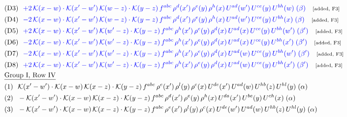 \documentclass[9pt]{article}
\begin{document}
\begin{align}
&\quad\text{(D3)}\ \ \textcolor{blue}{+2\,\mathcal{K}(x-w)\cdot\mathcal{K}(x'-w')\,\mathcal{K}(w-z)\cdot\mathcal{K}(y-z)\, f^{abc}\,\rho^{d}(x')\,\rho^{e}(y)\,\rho^{h}(x)\,U^{ad}(w')\,U^{ce}(y)\,U^{bh}(w)\;(\beta)}\quad\text{\scriptsize[added, F3]}\notag\\
&\quad\text{(D4)}\ \ \textcolor{blue}{-2\,\mathcal{K}(x-w)\cdot\mathcal{K}(x'-w')\,\mathcal{K}(w-z)\cdot\mathcal{K}(y-z)\, f^{abc}\,\rho^{d}(x')\,\rho^{e}(y)\,\rho^{h}(x)\,U^{ad}(w')\,U^{ce}(y)\,U^{bh}(x)\;(\beta)}\quad\text{\scriptsize[added, F3]}\notag\\
&\quad\text{(D5)}\ \ \textcolor{blue}{+2\,\mathcal{K}(x-w)\cdot\mathcal{K}(x'-w')\,\mathcal{K}(w'-z)\cdot\mathcal{K}(y-z)\, f^{abc}\,\rho^{h}(x')\,\rho^{e}(y)\,\rho^{d}(x)\,U^{ad}(x)\,U^{ce}(y)\,U^{bh}(w')\;(\beta')}\quad\text{\scriptsize[added, F3]}\notag\\
&\quad\text{(D6)}\ \ \textcolor{blue}{-2\,\mathcal{K}(x-w)\cdot\mathcal{K}(x'-w')\,\mathcal{K}(w'-z)\cdot\mathcal{K}(y-z)\, f^{abc}\,\rho^{h}(x')\,\rho^{e}(y)\,\rho^{d}(x)\,U^{ad}(x)\,U^{ce}(y)\,U^{bh}(x')\;(\beta')}\quad\text{\scriptsize[added, F3]}\notag\\
&\quad\text{(D7)}\ \ \textcolor{blue}{-2\,\mathcal{K}(x-w)\cdot\mathcal{K}(x'-w')\,\mathcal{K}(w'-z)\cdot\mathcal{K}(y-z)\, f^{abc}\,\rho^{h}(x')\,\rho^{e}(y)\,\rho^{d}(x)\,U^{ad}(w)\,U^{ce}(y)\,U^{bh}(w')\;(\beta')}\quad\text{\scriptsize[added, F3]}\notag\\
&\quad\text{(D8)}\ \ \textcolor{blue}{+2\,\mathcal{K}(x-w)\cdot\mathcal{K}(x'-w')\,\mathcal{K}(w'-z)\cdot\mathcal{K}(y-z)\, f^{abc}\,\rho^{h}(x')\,\rho^{e}(y)\,\rho^{d}(x)\,U^{ad}(w)\,U^{ce}(y)\,U^{bh}(x')\;(\beta')}\quad\text{\scriptsize[added, F3]}\notag\\
&\quad\underline{\text{Group I, Row IV}}\notag\\
&\quad\text{(1)}\ \ \mathcal{K}(x'-w')\cdot \mathcal{K}(x-w)\,\mathcal{K}(x-z)\cdot \mathcal{K}(y-z)\,f^{abc}\, \rho^{e}(x')\, \rho^{l}(y)\,\rho^{c}(x)\, U^{de}(x')\,U^{ad}(w)\,U^{hb}(z)\,U^{hl}(y)\;(\alpha)\notag\\
&\quad\text{(2)}\ \ -\mathcal{K}(x'-w')\cdot \mathcal{K}(x-w)\,\mathcal{K}(x-z)\cdot \mathcal{K}(y-z)\,f^{abc}\, \rho^{d}(x')\, \rho^{e}(y)\,\rho^{h}(x)\, U^{da}(x')\,U^{be}(y)\,U^{ch}(x)\;(\alpha)\notag\\
&\quad\text{(3)}\ \ -\mathcal{K}(x'-w')\cdot \mathcal{K}(x-w)\,\mathcal{K}(x-z)\cdot \mathcal{K}(y-z)\,f^{abc}\, \rho^{e}(x')\, \rho^{l}(y)\,\rho^{c}(x)\, U^{de}(w')\,U^{ad}(w)\,U^{hb}(z)\,U^{hl}(y)\;(\alpha)\notag\\

\end{align}
\end{document}
